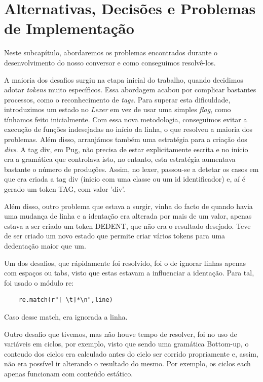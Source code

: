 \documentclass[11pt,a4paper]{report}%
\begin{document}
\section{Alternativas, Decisões e Problemas de Implementação}

Neste subcapítulo, abordaremos os problemas encontrados durante o desenvolvimento do nosso conversor e como conseguimos resolvê-los.

A maioria dos desafios surgiu na etapa inicial do trabalho, quando decidimos adotar \textit{tokens} muito específicos. Essa abordagem acabou por complicar bastantes processos, como o reconhecimento de \textit{tags}. Para superar esta dificuldade, introduzimos um estado no \textit{Lexer} em vez de usar uma simples \textit{flag}, como tínhamos feito inicialmente. Com essa nova metodologia, conseguimos evitar a execução de funções indesejadas no início da linha, o que resolveu a maioria dos problemas. Além disso, arranjámos também uma estratégia para a criação dos \textit{divs}. A tag div, em Pug, não precisa de estar explicitamente escrita e no início era a gramática que controlava isto, no entanto, esta estratégia aumentava bastante o número de produções. Assim, no lexer, passou-se a detetar os casos em que era criada a tag div (inicio com uma classe ou um id identificador) e, aí é gerado um token TAG, com valor 'div'.

Além disso, outro problema que estava a surgir, vinha do facto de quando havia uma mudança de linha e a identação era alterada por mais de um valor, apenas estava a ser criado um token DEDENT, que não era o resultado desejado. Teve de ser criado um novo estado que permite criar vários tokens para uma dedentação maior que um.

Um dos desafios, que rápidamente foi resolvido, foi o de ignorar linhas apenas com espaços ou tabs, visto que estas estavam a influenciar a identação. Para tal, foi usado o módulo re:
\begin{verbatim}
    re.match(r"[ \t]*\n",line)
\end{verbatim}
Caso desse match, era ignorada a linha.


Outro desafio que tivemos, mas não houve tempo de resolver, foi no uso de variáveis em ciclos, por exemplo, visto que sendo uma gramática Bottom-up, o conteudo dos ciclos era calculado antes do ciclo ser corrido propriamente e, assim, não era possível ir alterando o resultado do mesmo. Por exemplo, os ciclos each apenas funcionam com conteúdo estático.
\end{document}
